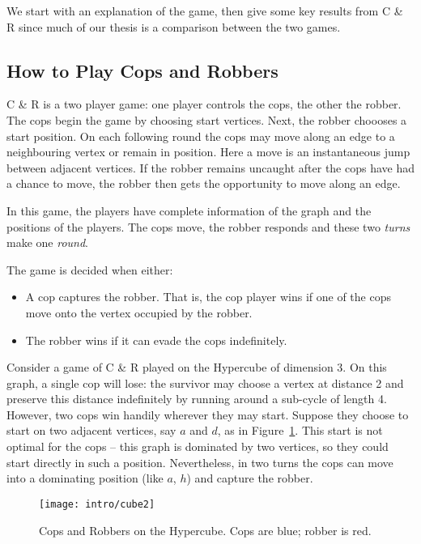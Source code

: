 We start with an explanation of the game, then give some key results from C \& R since much of our thesis is a comparison between the two games.

\subsection{How to Play Cops and Robbers}

C \& R is a two player game: one player controls the cops, the other the robber.
The cops begin the game by choosing start vertices. Next, the robber choooses a start position.
On each following round the cops may move along an edge to a neighbouring vertex
or remain in position.
Here a move is an instantaneous jump between adjacent vertices.
If the robber remains uncaught after the cops have had a chance to move, the
robber then gets the opportunity to move along an edge.

In this game, the players have complete information of the graph and the positions of the players.
The cops move, the robber responds and these two \textit{turns} make one \textit{round}.

The game is decided when either:
\begin{itemize}
\item A cop captures the robber. That is, the cop player wins if one of the cops move onto the vertex
occupied by the robber.
\item The robber wins if it can evade the cops indefinitely.
\end{itemize}

Consider a game of C \& R played on the Hypercube of dimension 3. On this graph, a single cop will lose: the survivor may choose a vertex at distance 2 and preserve this distance indefinitely by running around a sub-cycle of length 4. However, two cops win handily wherever they may start. Suppose they choose to start on two adjacent vertices, say $a$ and $d$, as in Figure~\ref{fig:hyper-cube2}. This start is not optimal for the cops -- this graph is dominated by two vertices, so they could start directly in such a position. Nevertheless, in two turns the cops can move into a dominating position (like $a$, $h$) and capture the robber.

\begin{figure}
\centering
\texttt{[image: intro/cube2]}
\caption{Cops and Robbers on the Hypercube. Cops are blue; robber is red. \label{fig:hyper-cube2}}
\end{figure}

